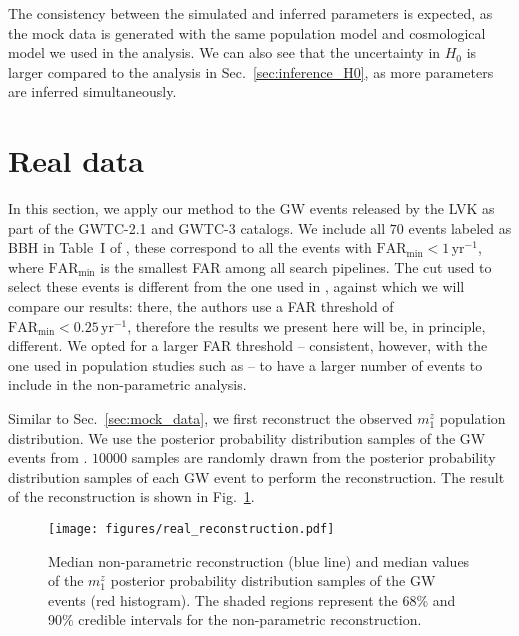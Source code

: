 \documentclass[sn-aps, pdflatex, iicol]{sn-jnl}
\begin{document}
The consistency between the simulated and inferred parameters is expected, as the mock data is generated with the same population model and cosmological model we used in the analysis.
We can also see that the uncertainty in $H_0$ is larger compared to the analysis in Sec.~\ref{sec:inference_H0}, as more parameters are inferred simultaneously.

\section{Real data}
\label{sec:real_data}

In this section, we apply our method to the \ac{GW} events released by the \ac{LVK} as part of the GWTC-2.1 \cite{LIGOScientific:2021usb, ligo_scientific_collaboration_and_virgo_2022_6513631} and GWTC-3 \cite{KAGRA:2021vkt, ligo_scientific_collaboration_and_virgo_2023_8177023} catalogs.
We include all $70$ events labeled as BBH in Table~I of \cite{KAGRA:2021duu}, these correspond to all the events with $\mathrm{FAR_{min}} < 1\, \mathrm{yr}^{-1}$, where $\mathrm{FAR_{min}}$ is the smallest \ac{FAR} among all search pipelines.
The cut used to select these events is different from the one used in \cite{LIGOScientific:2021aug}, against which we will compare our results: there, the authors use a \ac{FAR} threshold of $\mathrm{FAR_{min}} < 0.25\, \mathrm{yr}^{-1}$, therefore the results we present here will be, in principle, different.
We opted for a larger \ac{FAR} threshold -- consistent, however, with the one used in population studies such as \cite{KAGRA:2021duu} -- to have a larger number of events to include in the non-parametric analysis.

Similar to Sec.~\ref{sec:mock_data}, we first reconstruct the observed $m^z_1$ population distribution.
We use the posterior probability distribution samples of the \ac{GW} events from \cite{LIGOScientific:2019lzm, KAGRA:2023pio}.
$10000$ samples are randomly drawn from the posterior probability distribution samples of each \ac{GW} event to perform the reconstruction.
The result of the reconstruction is shown in Fig.~\ref{fig:real_reconstruction}.
\begin{figure}
    \texttt{[image: figures/real\_reconstruction.pdf]}
    \caption{
        Median non-parametric reconstruction (blue line) and median values of the $m^z_1$ posterior probability distribution samples of the \ac{GW} events (red histogram).
        The shaded regions represent the 68\% and 90\% credible intervals for the non-parametric reconstruction.
    }
    \label{fig:real_reconstruction}
\end{figure}
\end{document}
